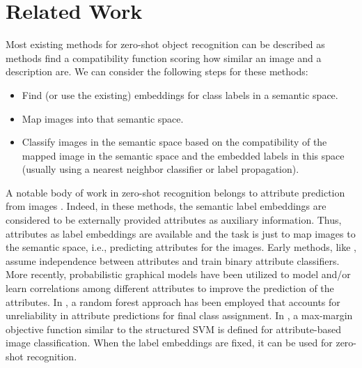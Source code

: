 \documentclass[10pt,twocolumn,letterpaper]{article}
\begin{document}
\section{Related Work} \label{related}
Most existing methods for zero-shot object recognition can be described as methods find a compatibility function scoring how
similar an image and a description are.
We can consider the following steps for these methods:
\begin{itemize}
  \item Find (or use the existing) embeddings for class labels in a semantic space.
  \item Map images into that semantic space.
  \item Classify images in the semantic space based on the compatibility of the mapped image in the semantic space and the embedded labels in this space (usually using a nearest neighbor classifier or label propagation).
\end{itemize}
A notable body of work in zero-shot recognition belongs to attribute prediction from images \cite{lampert09, topicmodel, ajoint11, unified13, suzuki14}. Indeed, in these methods, the semantic label embeddings are considered to be externally provided attributes as auxiliary information. Thus, attributes as label embeddings are available and the task is just to map images to the semantic space, i.e., predicting attributes for the images.
Early methods, like \cite{lampert09}, assume independence between attributes and train binary attribute classifiers.
More recently, probabilistic graphical models have been utilized to model and/or learn correlations among different attributes \cite{topicmodel, unified13} to improve the prediction of the attributes.
In \cite{jayaraman14}, a random forest approach has been employed that accounts for unreliability in attribute predictions for final class assignment.
In \cite{Akata2015pami}, a max-margin objective function similar to the structured SVM is defined for attribute-based image classification. When the label embeddings are fixed, it can be used for zero-shot recognition.

\end{document}
